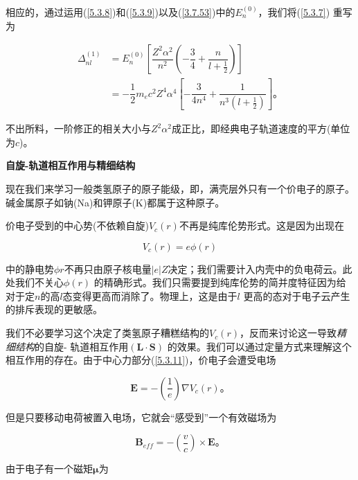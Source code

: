 ﻿\documentclass[UTF8,twoside]{ctexart}
\begin{document}
相应的，通过运用(\ref{5.3.8})和(\ref{5.3.9})以及(\ref{3.7.53})中的$E_n^{(0)}$，我们将(\ref{5.3.7}) 重写为

\begin{subequations}
\begin{align} \label{5.3.10}
\Delta_{nl}^{(1)}&=E_n^{(0)}\left[\dfrac{Z^2\alpha^2}{n^2}\left(- \dfrac{3}{4}+\dfrac{n}{l+\frac{1}{2}}\right)\right]\\
&=-\dfrac{1}{2}m_ec^2Z^4\alpha^4\left[- \dfrac{3}{4n^4}+\dfrac{1}{n^3\left(l+\frac{1}{2}\right)}\right]\text{。}
\end{align}
\end{subequations}

\noindent 不出所料，一阶修正的相关大小与$Z^2\alpha^2$成正比，即经典电子轨道速度的平方(单位为$c$)。

\noindent \textbf{自旋-轨道相互作用与精细结构}

\noindent 现在我们来学习一般类氢原子的原子能级，即，满壳层外只有一个价电子的原子。碱金属原子如钠(Na)和钾原子(K)都属于这种原子。

价电子受到的中心势(不依赖自旋)$V_c(r)$不再是纯库伦势形式。这是因为出现在

\begin{equation} \label{5.3.11}
V_c(r)=e\phi(r)
\end{equation}

\noindent 中的静电势$\phi{r}$不再只由原子核电量$|e|Z$决定；我们需要计入内壳中的负电荷云。此处我们不关心$\phi(r)$ 的精确形式。我们只需要提到纯库伦势的简并度特征因为给对于定$n$的高$l$态变得更高而消除了。物理上，这是由于$l$ 更高的态对于电子云产生的排斥表现的更敏感。

我们不必要学习这个决定了类氢原子糟糕结构的$V_c(r)$，反而来讨论这一导致\emph{精细结构}的自旋- 轨道相互作用$({\boldsymbol{L\cdot S}})$ 的效果。我们可以通过定量方式来理解这个相互作用的存在。由于中心力部分(\ref{5.3.11})，价电子会遭受电场

\begin{equation} \label{5.3.12}
{\boldsymbol{E}}=-\left(\dfrac{1}{e}\right)\nabla V_c(r)\text{。}
\end{equation}

\noindent 但是只要移动电荷被置入电场，它就会“感受到”一个有效磁场为

\begin{equation} \label{5.3.13}
{\boldsymbol{B}}_{e\!f\!f}=-\left(\dfrac{{v}}{c}\right)\times {\boldsymbol{E}}\text{。}
\end{equation}

\noindent 由于电子有一个磁矩$\boldsymbol{\mu}$为
\end{document}

